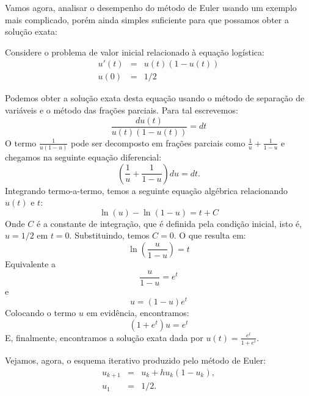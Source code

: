 Vamos agora, analisar o desempenho do método de Euler usando um exemplo mais complicado, porém ainda simples suficiente para que possamos obter a solução exata:
\begin{ex}\label{ex_euler_1}
Considere o problema de valor inicial relacionado à equação logística:
\begin{eqnarray*}
u'(t)&=&u(t)(1-u(t))\\
u(0)&=&1/2
\end{eqnarray*}
\end{ex}
Podemos obter a solução exata desta equação usando o método de separação de variáveis e o método das frações parciais. Para tal escrevemos:
\begin{equation*}
\frac{du(t)}{u(t)(1-u(t))}=dt
\end{equation*}
O termo $\frac{1}{u(1-u)}$ pode ser decomposto em frações parciais como $\frac{1}{u}+\frac{1}{1-u}$ e chegamos na seguinte equação diferencial:
\begin{equation*}
\left(\frac{1}{u}+\frac{1}{1-u}\right)du=dt.
\end{equation*}
Integrando termo-a-termo, temos a seguinte equação algébrica relacionando $u(t)$ e $t$:
\begin{equation*}
\ln(u)-\ln(1-u)=t+C
\end{equation*}
Onde $C$ é a constante de integração, que é definida pela condição inicial, isto é, $u=1/2$ em $t=0$. Substituindo, temos $C=0$. O que resulta em:
\begin{equation*}
\ln\left(\frac{u}{1-u}\right)=t
\end{equation*}
Equivalente a
\begin{equation*}
\frac{u}{1-u}=e^{t}
\end{equation*}
e
\begin{equation*}
u=(1-u)e^{t}
\end{equation*}
Colocando o termo $u$ em evidência, encontramos:
\begin{equation}
(1+e^t)u=e^{t}
\end{equation}
E, finalmente, encontramos a solução exata dada por $u(t)=\frac{e^t}{1+e^{t}}$.

Vejamos, agora, o esquema iterativo produzido pelo método de Euler:
\begin{eqnarray*}
u_{k+1}&=& u_k+h u_k(1-u_k), \\
u_1&=& 1/2.
\end{eqnarray*}

